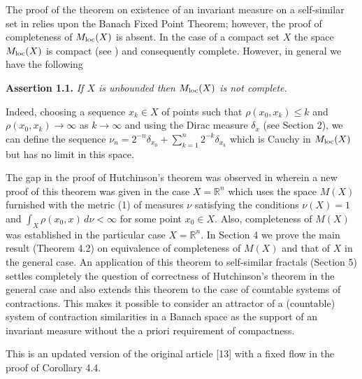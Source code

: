 \documentclass[11pt,a4paper]{article}
\begin{document}
The proof of the theorem on existence of an invariant measure
on a self-similar set in \cite[4.4(1)]{Ht} relies
upon the Banach Fixed Point Theorem;
however, the proof of completeness of $M_{\rm loc}(X)$ is absent.
In the case of a compact set $X$ the space $M_{\rm loc}(X)$
is compact (see \cite[Chapter 8, \S 4]{KnAk}) and consequently complete.
However, in general we have the following

\vspace{1ex}
 {\bf Assertion 1.1.} \sl
 If $X$ is unbounded then $M_{\rm loc}(X)$ is not complete. \rm
\vspace{1ex}

Indeed, choosing a sequence $x_k\in X$
of points such that $\rho(x_0,x_k)\le k$ and $\rho(x_0,x_k)\to\infty$ as $k\to\infty$
and using the Dirac measure $\delta_x$ (see Section 2),
we can define the sequence
$\nu_n=2^{-n}\delta_{x_0}+\sum_{k=1}^{n} 2^{-k}\delta_{x_k}$
which is Cauchy in $M_{\rm loc}(X)$ but has no limit in this space.

The gap in the proof of Hutchinson's theorem was observed in \cite{Ak}
wherein a new proof of this theorem was given in the case $X=\mathbb{R}^n$
which uses the space $M(X)$ furnished with the metric (1) of measures $\nu$
satisfying the conditions $\nu(X)=1$ and
$\int_X\rho(x_0,x)\,d\nu<\infty$ for some point $x_0\in X$.
Also, completeness of $M(X)$ was established
in the particular case $X=\mathbb{R}^n$.
In Section 4 we prove the main result (Theorem 4.2)
on equivalence of completeness of $M(X)$
and that of $X$ in the general case.
An application of this theorem to self-similar fractals (Section 5)
settles completely the question of correctness of Hutchinson's theorem
in the general case and also extends this theorem to the
case of countable systems of contractions.
This makes it possible to consider an attractor of a (countable)
system of contraction similarities
in a Banach space as the support of an invariant measure
without the a priori requirement of compactness.

This is an updated version of the original article [13]
with a fixed flow in the proof of Corollary 4.4.
\end{document}

